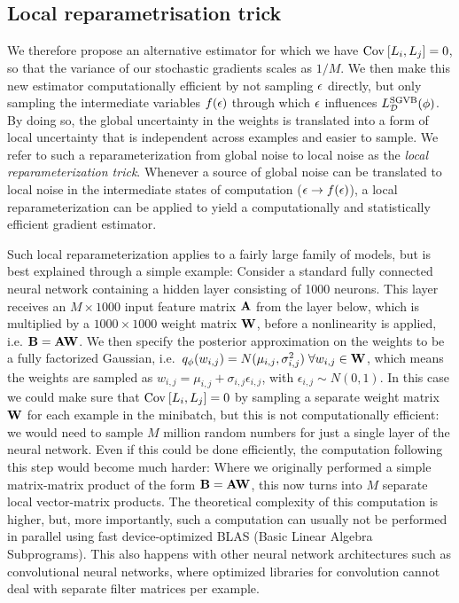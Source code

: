 \subsection{Local  reparametrisation  trick}

We therefore propose an alternative estimator for which we have $\text{Cov}_{}\left[L_{i},L_{j}\right] = 0$, so that the variance of our stochastic gradients scales as $1/M$. We then make this new estimator computationally efficient by not sampling $\mathbf{\epsilon}$ directly, but only sampling the intermediate variables $f(\mathbf{\epsilon})$ through which $\mathbf{\epsilon}$ influences $L_{\mathcal{D}}^\text{SGVB}(\mathbf{\phi})$. By doing so, the global uncertainty in the weights is translated into a form of local uncertainty that is independent across examples and easier to sample. We refer to such a reparameterization from global noise to local noise as the \emph{local reparameterization trick}. Whenever a source of global noise can be translated to local noise in the intermediate states of computation ($\mathbf{\epsilon} \rightarrow f(\mathbf{\epsilon})$), a local reparameterization can be applied to yield a computationally and statistically efficient gradient estimator.

Such local reparameterization applies to a fairly large family of models, but is best explained through a simple example: Consider a standard fully connected neural network containing a hidden layer consisting of 1000 neurons. This layer receives an $M \times 1000$ input feature matrix $\mathbf{A}$ from the layer below, which is multiplied by a $1000 \times 1000$ weight matrix $\mathbf{W}$, before a nonlinearity is applied, i.e. $\mathbf{B} = \mathbf{A}\mathbf{W}$. We then specify the posterior approximation on the weights to be a fully factorized Gaussian, i.e.\ $q_\mathbf{\phi}(w_{i,j}) = N(\mu_{i,j},\sigma^{2}_{i,j}) \hspace{0.1cm} \forall w_{i,j} \in \mathbf{W}$, which means the weights are sampled as $w_{i,j} = \mu_{i,j} + \sigma_{i,j}\epsilon_{i,j}$, with $\epsilon_{i,j} \sim N(0,1)$. In this case we could make sure that $\text{Cov}_{}\left[L_{i},L_{j}\right] = 0$ by sampling a separate weight matrix $\mathbf{W}$ for each example in the minibatch, but this is not computationally efficient: we would need to sample $M$ million random numbers for just a single layer of the neural network. Even if this could be done efficiently, the computation following this step would become much harder: Where we originally performed a simple matrix-matrix product of the form $\mathbf{B} = \mathbf{A}\mathbf{W}$, this now turns into $M$ separate local vector-matrix products. The theoretical complexity of this computation is higher, but, more importantly, such a computation can usually not be performed in parallel using fast device-optimized BLAS (Basic Linear Algebra Subprograms). This also happens with other neural network architectures such as convolutional neural networks, where optimized libraries for convolution cannot deal with separate filter matrices per example.

